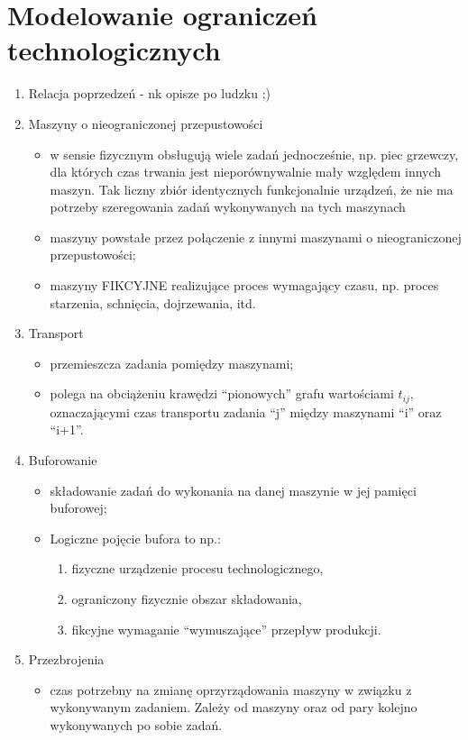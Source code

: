 \documentclass[10pt, a
4paper]{article}
\begin{document}
\section{Modelowanie ograniczeń technologicznych}
\begin{enumerate}
	\item Relacja poprzedzeń - nk opisze po ludzku ;)
	\item Maszyny o nieograniczonej przepustowości
	\begin{itemize}
		\item w sensie fizycznym obsługują wiele zadań jednocześnie, np. piec grzewczy,
				dla których czas trwania jest nieporównywalnie mały względem innych maszyn.
				Tak liczny zbiór identycznych funkcjonalnie urządzeń, że nie ma potrzeby szeregowania zadań wykonywanych na tych maszynach 
		\item maszyny powstałe przez połączenie z innymi maszynami o nieograniczonej przepustowości;
		\item maszyny FIKCYJNE realizujące proces wymagający czasu, np. proces starzenia, schnięcia, dojrzewania, itd.
	\end{itemize}
	\item Transport
    \begin{itemize}
    	\item przemieszcza zadania pomiędzy maszynami;
    	\item polega na obciążeniu krawędzi “pionowych” grafu wartościami $t_{ij}$, oznaczającymi czas transportu zadania “j”
        		między maszynami “i” oraz “i+1”.
    \end{itemize}
	\item Buforowanie
    \begin{itemize}
    	\item składowanie zadań do wykonania na danej maszynie w jej pamięci buforowej;
		\item Logiczne pojęcie bufora to np.:
    	\begin{enumerate}
    		\item fizyczne urządzenie procesu technologicznego,
			\item ograniczony fizycznie obszar składowania,
			\item fikcyjne wymaganie “wymuszające” przepływ produkcji.
     	\end{enumerate}
      \end{itemize}
	\item Przezbrojenia
    \begin{itemize}
		\item czas potrzebny na zmianę oprzyrządowania maszyny w związku z wykonywanym zadaniem. Zależy od maszyny oraz od pary kolejno wykonywanych po sobie zadań.

\end{itemize}
\end{enumerate}
\end{document}
